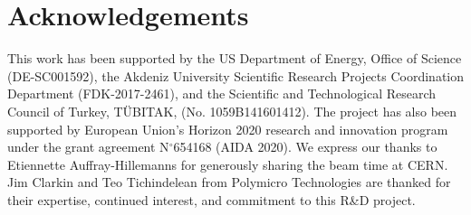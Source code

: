 \documentclass[a4paper,11pt]{article}
\begin{document}


\section{Acknowledgements}
This work has been supported by the US Department of Energy, Office of Science (DE-SC001592), the Akdeniz University Scientific Research Projects Coordination Department (FDK-2017-2461), and the Scientific and Technological Research Council of Turkey, T\"UBITAK, (No. 1059B141601412). The project has also been supported by European Union's Horizon 2020 research and innovation program under the grant agreement N$^\circ$654168 (AIDA 2020). We express our thanks to Etiennette Auffray-Hillemanns for generously sharing the beam time at CERN. Jim Clarkin and Teo Tichindelean from Polymicro Technologies are thanked for their expertise, continued interest, and commitment to this R\&D project.




\end{document}
